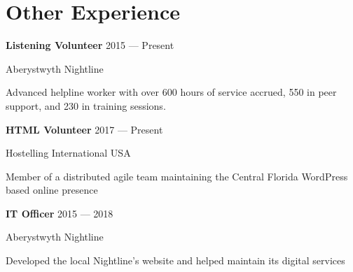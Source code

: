 \section{Other Experience}

\parbox[t][][t]{\linewidth}{
	\parbox{\linewidth}{\textbf{Listening Volunteer} \hfill {{2015 --- Present}}}
	\parbox{\linewidth}{Aberystwyth Nightline}
	\smallbreak
	\smallskip
	Advanced helpline worker with over 600 hours of service accrued, 550 in peer support, and 230 in training sessions.
	\bigbreak
	\smallskip
}

\parbox[t][][t]{\linewidth}{
	\parbox{\linewidth}{\textbf{HTML Volunteer} \hfill {{2017 --- Present}}}
	\parbox{\linewidth}{Hostelling International USA}
	\smallbreak
	\smallskip
	Member of a distributed agile team maintaining the Central Florida WordPress based online presence
	\bigbreak
	\smallskip
}

\parbox[t][][t]{\linewidth}{
	\parbox{\linewidth}{\textbf{IT Officer} \hfill {{2015 --- 2018}}}
	\parbox{\linewidth}{Aberystwyth Nightline}
	\smallbreak
	\smallskip
	Developed the local Nightline's website and helped maintain its digital services
}